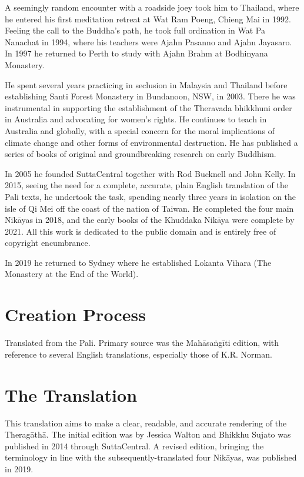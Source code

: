 \documentclass[12pt,openany]{book}%
\begin{document}
A seemingly random encounter with a roadside joey took him to Thailand, where he entered his first meditation retreat at Wat Ram Poeng, Chieng Mai in 1992. Feeling the call to the Buddha’s path, he took full ordination in Wat Pa Nanachat in 1994, where his teachers were Ajahn Pasanno and Ajahn Jayasaro. In 1997 he returned to Perth to study with Ajahn Brahm at Bodhinyana Monastery. 

He spent several years practicing in seclusion in Malaysia and Thailand before establishing Santi Forest Monastery in Bundanoon, NSW, in 2003. There he was instrumental in supporting the establishment of the Theravada bhikkhuni order in Australia and advocating for women’s rights. He continues to teach in Australia and globally, with a special concern for the moral implications of climate change and other forms of environmental destruction. He has published a series of books of original and groundbreaking research on early Buddhism. 

In 2005 he founded SuttaCentral together with Rod Bucknell and John Kelly. In 2015, seeing the need for a complete, accurate, plain English translation of the Pali texts, he undertook the task, spending nearly three years in isolation on the isle of Qi Mei off the coast of the nation of Taiwan. He completed the four main \textsanskrit{Nikāyas} in 2018, and the early books of the Khuddaka \textsanskrit{Nikāya} were complete by 2021. All this work is dedicated to the public domain and is entirely free of copyright encumbrance. 

In 2019 he returned to Sydney where he established Lokanta Vihara (The Monastery at the End of the World). 

\section*{Creation Process}

Translated from the Pali. Primary source was the \textsanskrit{Mahāsaṅgīti} edition, with reference to several English translations, especially those of K.R. Norman.

\section*{The Translation}

This translation aims to make a clear, readable, and accurate rendering of the \textsanskrit{Theragāthā}. The initial edition was by Jessica Walton and Bhikkhu Sujato was published in 2014 through SuttaCentral. A revised edition, bringing the terminology in line with the subsequently-translated four \textsanskrit{Nikāyas}, was published in 2019.
\end{document}
